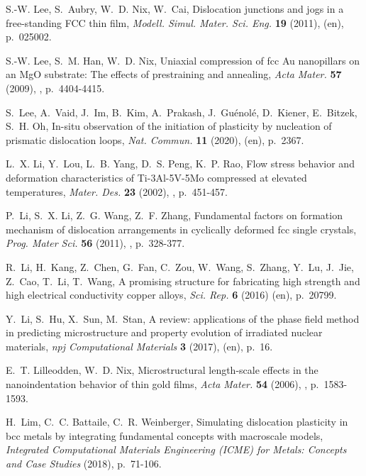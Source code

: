 \documentclass[CRPHYS,Unicode,manuscript]{cedram}
\begin{document}
\begin{thebibliography}{100}
S.-W. Lee, S.~Aubry, W.~D. Nix, W.~Cai, {\og Dislocation junctions and jogs in
  a free-standing {FCC} thin film\fg}, \emph{Modell. Simul. Mater. Sci. Eng.}
  \textbf{19} (2011),  (en), p.~025002.

S.-W. Lee, S.~M. Han, W.~D. Nix, {\og Uniaxial compression of fcc Au
  nanopillars on an {MgO} substrate: The effects of prestraining and
  annealing\fg}, \emph{Acta Mater.} \textbf{57} (2009), ,
  p.~4404-4415.

S.~Lee, A.~Vaid, J.~Im, B.~Kim, A.~Prakash, J.~Gu{\'e}nol{\'e}, D.~Kiener,
  E.~Bitzek, S.~H. Oh, {\og In-situ observation of the initiation of plasticity
  by nucleation of prismatic dislocation loops\fg}, \emph{Nat. Commun.}
  \textbf{11} (2020),  (en), p.~2367.

L.~X. Li, Y.~Lou, L.~B. Yang, D.~S. Peng, K.~P. Rao, {\og Flow stress behavior
  and deformation characteristics of {Ti-3Al-5V-5Mo} compressed at elevated
  temperatures\fg}, \emph{Mater. Des.} \textbf{23} (2002), ,
  p.~451-457.

P.~Li, S.~X. Li, Z.~G. Wang, Z.~F. Zhang, {\og Fundamental factors on formation
  mechanism of dislocation arrangements in cyclically deformed fcc single
  crystals\fg}, \emph{Prog. Mater Sci.} \textbf{56} (2011), ,
  p.~328-377.

R.~Li, H.~Kang, Z.~Chen, G.~Fan, C.~Zou, W.~Wang, S.~Zhang, Y.~Lu, J.~Jie,
  Z.~Cao, T.~Li, T.~Wang, {\og A promising structure for fabricating high
  strength and high electrical conductivity copper alloys\fg}, \emph{Sci. Rep.}
  \textbf{6} (2016) (en), p.~20799.

Y.~Li, S.~Hu, X.~Sun, M.~Stan, {\og A review: applications of the phase field
  method in predicting microstructure and property evolution of irradiated
  nuclear materials\fg}, \emph{npj Computational Materials} \textbf{3} (2017),
   (en), p.~16.

E.~T. Lilleodden, W.~D. Nix, {\og Microstructural length-scale effects in the
  nanoindentation behavior of thin gold films\fg}, \emph{Acta Mater.}
  \textbf{54} (2006), , p.~1583-1593.

H.~Lim, C.~C. Battaile, C.~R. Weinberger, {\og Simulating dislocation
  plasticity in bcc metals by integrating fundamental concepts with macroscale
  models\fg}, \emph{Integrated Computational Materials Engineering (ICME) for
  Metals: Concepts and Case Studies} (2018), p.~71-106.


\end{thebibliography}
\end{document}
